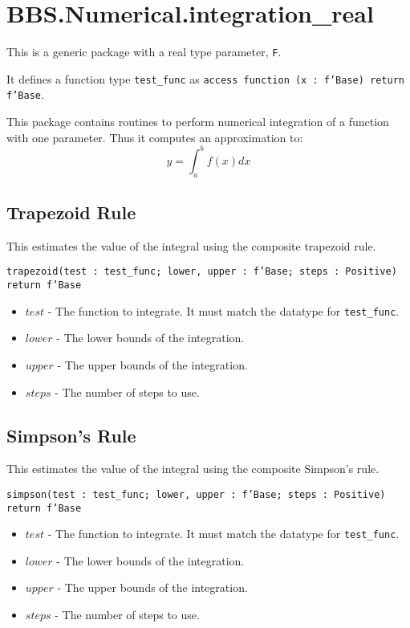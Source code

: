 \documentclass[10pt, openany]{book}
\newcommand{\function}[1]{\texttt{#1}}
\newcommand{\datatype}[1]{\texttt{#1}}
\begin{document}
\section{BBS.Numerical.integration\_real}
This is a generic package with a real type parameter, \datatype{F}.

It defines a function type \datatype{test\_func} as \datatype{access function (x : f'Base) return f'Base}.

This package contains routines to perform numerical integration of a function with one parameter.  Thus it computes an approximation to:
\begin{displaymath}
  y = \int_a^b f(x) dx
\end{displaymath}

\subsection{Trapezoid Rule}
This estimates the value of the integral using the composite trapezoid rule.

\function{trapezoid(test : test\_func; lower, upper : f'Base; steps : Positive) return f'Base}
\begin{itemize}
  \item $test$ - The function to integrate.  It must match the datatype for \datatype{test\_func}.
  \item $lower$ - The lower bounds of the integration.
  \item $upper$ - The upper bounds of the integration.
  \item $steps$ - The number of steps to use.
\end{itemize}

\subsection{Simpson's Rule}
This estimates the value of the integral using the composite Simpson's rule.

\function{simpson(test : test\_func; lower, upper : f'Base; steps : Positive) return f'Base}
\begin{itemize}
  \item $test$ - The function to integrate.  It must match the datatype for \datatype{test\_func}.
  \item $lower$ - The lower bounds of the integration.
  \item $upper$ - The upper bounds of the integration.
  \item $steps$ - The number of steps to use.
\end{itemize}
\end{document}
